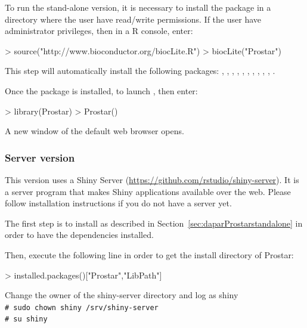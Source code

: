 \documentclass[12pt]{article}
\newcommand{\shellcmd}[1]{\\\indent\indent\texttt{\footnotesize\# #1}}
\begin{document}
To run the stand-alone version, it is necessary to install the package in a 
directory where the user have read/write permissions. If the user have 
administrator privileges, then in a R console, enter:
\begin{Schunk}
\begin{Sinput}
> source("http://www.bioconductor.org/biocLite.R")
> biocLite("Prostar")
\end{Sinput}
\end{Schunk}

This step will automatically install the following packages: , 
, , , 
, , , , ,
, .

Once the package is installed, to launch , then enter:
\begin{Schunk}
\begin{Sinput}
> library(Prostar)
> Prostar()
\end{Sinput}
\end{Schunk}

A new window of the default web browser opens. 


\subsubsection{Server version} \label{sec:daparProstarserver}
This version uses a Shiny Server 
(\url{https://github.com/rstudio/shiny-server}). It is a server program that 
makes Shiny applications available over the web. Please follow installation 
instructions if you do not have a server yet.

The first step is to install  as described in 
Section~\ref{sec:daparProstarstandalone} in order to have the dependencies 
installed.

Then, execute the following line in order to get the install directory of Prostar:

\begin{Schunk}
\begin{Sinput}
> installed.packages()["Prostar","LibPath"]
\end{Sinput}
\end{Schunk}


Change the owner of the shiny-server directory and log as shiny
\shellcmd{sudo chown shiny /srv/shiny-server}
\shellcmd{su shiny}\newline
\end{document}

